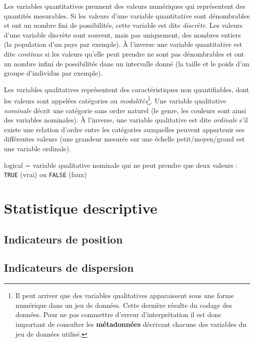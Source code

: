 \documentclass[
  french,
]{scrbook}
\providecommand{\tightlist}{%
  \setlength{\itemsep}{0pt}\setlength{\parskip}{0pt}}
\begin{document}
\begin{description}
\tightlist
\item[Variables quantitatives]
Les variables quantitatives prennent des valeurs numériques qui représentent des quantités mesurables. Si les valeurs d'une variable quantitative sont dénombrables et ont un nombre fini de possibilités, cette variable est dite \emph{discrète}. Les valeurs d'une variable discrète sont souvent, mais pas uniquement, des nombres entiers (la population d'un pays par exemple). À l'inverse une variable quantitative est dite \emph{continue} si les valeurs qu'elle peut prendre ne sont pas dénombrables et ont un nombre infini de possibilités dans un intervalle donné (la taille et le poids d'un groupe d'individus par exemple).
\item[Variables qualitatives]
Les variables qualitatives représentent des caractéristiques non quantifiables, dont les valeurs sont appelées catégories ou \emph{modalités}\footnote{Il peut arriver que des variables qualitatives apparaissent sous une forme numérique dans un jeu de données. Cette dernière résulte du codage des données. Pour ne pas commettre d'erreur d'interprétation il est donc important de consulter les \textbf{métadonnées} décrivant chacune des variables du jeu de données utilisé.}.
Une variable qualitative \emph{nominale} décrit une catégorie sans ordre naturel (le genre, les couleurs sont ainsi des variables nominales). À l'inverse, une variable qualitative est dite \emph{ordinale} s'il existe une relation d'ordre entre les catégories auxquelles peuvent appartenir ses différentes valeurs (une grandeur mesurée sur une échelle petit/moyen/grand est une variable ordinale).
\end{description}

logical = variable qualitative nominale qui ne peut prendre que deux valeurs : \texttt{TRUE} (vrai) ou \texttt{FALSE} (faux)

\hypertarget{statistique-descriptive}{%
\chapter{Statistique descriptive}\label{statistique-descriptive}}

\hypertarget{indicateurs-de-position}{%
\section{Indicateurs de position}\label{indicateurs-de-position}}

\hypertarget{indicateurs-de-dispersion}{%
\section{Indicateurs de dispersion}\label{indicateurs-de-dispersion}}
\end{document}
